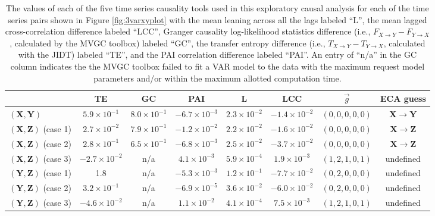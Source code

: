 \documentclass{article}[10pt]
\begin{document}
\begin{table}
\begin{center}
\begin{tabular}{lccccccc}
  & TE & GC & PAI & L & LCC & $\vec{g}$ & ECA guess\\
\midrule
$(\mathbf{X},\mathbf{Y})$ & $5.9\times 10^{-1}$ & $8.0\times 10^{-1}$ & $-6.7\times 10^{-3}$ & $2.3\times 10^{-2}$ & $-1.4\times 10^{-2}$ & $(0,0,0,0,0)$ & $\mathbf{X}\rightarrow\mathbf{Y}$\\
$(\mathbf{X},\mathbf{Z})$ (case 1) & $2.7\times 10^{-2}$ & $7.9\times 10^{-1}$ & $-1.2\times 10^{-2}$ & $2.2\times 10^{-2}$ & $-1.6\times 10^{-2}$ & $(0,0,0,0,0)$ & $\mathbf{X}\rightarrow\mathbf{Z}$\\
$(\mathbf{X},\mathbf{Z})$ (case 2) & $2.8\times 10^{-1}$ & $6.5\times 10^{-1}$ & $-6.8\times 10^{-3}$ & $2.5\times 10^{-2}$ & $-3.7\times 10^{-2}$ & $(0,0,0,0,0)$ & $\mathbf{X}\rightarrow\mathbf{Z}$\\
$(\mathbf{X},\mathbf{Z})$ (case 3) & $-2.7\times 10^{-2}$ & n/a & $4.1\times 10^{-3}$ & $5.9\times 10^{-4}$ & $1.9\times 10^{-3}$ & $(1,2,1,0,1)$ & undefined\\
$(\mathbf{Y},\mathbf{Z})$ (case 1) & 1.8 & n/a & $-5.3\times 10^{-3}$ & $1.2\times 10^{-1}$ & $-7.7\times 10^{-2}$ & $(0,2,0,0,0)$ & undefined\\
$(\mathbf{Y},\mathbf{Z})$ (case 2) & $3.2\times 10^{-1}$ & n/a & $-6.9\times 10^{-5}$ & $3.6\times 10^{-2}$ & $-6.0\times 10^{-2}$ & $(0,2,0,0,0)$ & undefined\\
$(\mathbf{Y},\mathbf{Z})$ (case 3) & $-4.6\times 10^{-2}$ & n/a & $1.1\times 10^{-2}$ & $4.1\times 10^{-4}$ & $7.5\times 10^{-3}$ & $(1,2,1,0,1)$ & undefined\\
\end{tabular}
\caption{The values of each of the five time series causality tools used in this exploratory causal analysis for each of the time series pairs shown in Figure \ref{fig:3varxyplot} with the mean leaning across all the lags labeled ``L'', the mean lagged cross-correlation difference labeled ``LCC'', Granger causality log-likelihood statistics difference (i.e., $F_{X\rightarrow Y}-F_{Y\rightarrow X}$, calculated by the MVGC toolbox) labeled ``GC'', the transfer entropy difference (i.e., $T_{X\rightarrow Y}-T_{Y\rightarrow X}$, calculated with the JIDT) labeled ``TE'', and the PAI correlation difference labeled ``PAI''.  An entry of ``n/a'' in the GC column indicates the the MVGC toolbox failed to fit a VAR model to the data with the maximum request model parameters and/or within the maximum allotted computation time.}
\label{tab:3varEx}
\end{center}
\end{table}
\end{document}
